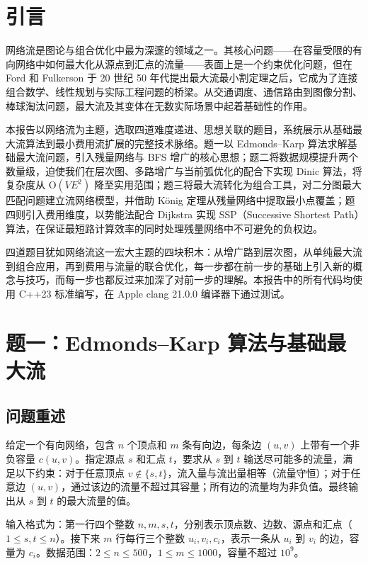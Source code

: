 \documentclass[12pt, a4paper]{academics}
\begin{document}
\makeacademicscover

\section{引言}

网络流是图论与组合优化中最为深邃的领域之一。其核心问题——在容量受限的有向网络中如何最大化从源点到汇点的流量——表面上是一个约束优化问题，但在 Ford 和 Fulkerson 于 20 世纪 50 年代提出最大流最小割定理之后，它成为了连接组合数学、线性规划与实际工程问题的桥梁。从交通调度、通信路由到图像分割、棒球淘汰问题，最大流及其变体在无数实际场景中起着基础性的作用。

本报告以网络流为主题，选取四道难度递进、思想关联的题目，系统展示从基础最大流算法到最小费用流扩展的完整技术脉络。题一以 Edmonds--Karp 算法求解基础最大流问题，引入残量网络与 BFS 增广的核心思想；题二将数据规模提升两个数量级，迫使我们在层次图、多路增广与当前弧优化的配合下实现 Dinic 算法，将复杂度从 $\mathrm{O}(VE^2)$ 降至实用范围；题三将最大流转化为组合工具，对二分图最大匹配问题建立流网络模型，并借助 K\"onig 定理从残量网络中提取最小点覆盖；题四则引入费用维度，以势能法配合 Dijkstra 实现 SSP（Successive Shortest Path）算法，在保证最短路计算效率的同时处理残量网络中不可避免的负权边。

四道题目犹如网络流这一宏大主题的四块积木：从增广路到层次图，从单纯最大流到组合应用，再到费用与流量的联合优化，每一步都在前一步的基础上引入新的概念与技巧，而每一步也都反过来加深了对前一步的理解。本报告中的所有代码均使用 C++23 标准编写，在 Apple clang 21.0.0 编译器下通过测试。

\section{题一：Edmonds--Karp 算法与基础最大流}

\subsection{问题重述}

给定一个有向网络，包含 $n$ 个顶点和 $m$ 条有向边，每条边 $(u, v)$ 上带有一个非负容量 $c(u, v)$。指定源点 $s$ 和汇点 $t$，要求从 $s$ 到 $t$ 输送尽可能多的流量，满足以下约束：对于任意顶点 $v \notin \{s, t\}$，流入量与流出量相等（流量守恒）；对于任意边 $(u, v)$，通过该边的流量不超过其容量；所有边的流量均为非负值。最终输出从 $s$ 到 $t$ 的最大流量的值。

输入格式为：第一行四个整数 $n, m, s, t$，分别表示顶点数、边数、源点和汇点（$1 \le s, t \le n$）。接下来 $m$ 行每行三个整数 $u_i, v_i, c_i$，表示一条从 $u_i$ 到 $v_i$ 的边，容量为 $c_i$。数据范围：$2 \le n \le 500$，$1 \le m \le 1000$，容量不超过 $10^9$。
\end{document}
